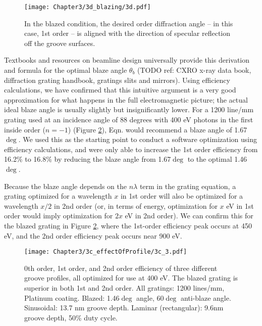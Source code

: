 \begin{figure}[htbp] %
   \centering
   \texttt{[image: Chapter3/3d\_blazing/3d.pdf]} 
   \caption{In the blazed condition, the desired order diffraction angle -- in this case, 1st order -- is aligned with the direction of specular reflection off the groove surfaces.}
   \label{3d}
\end{figure}

Textbooks and resources on beamline design universally provide this derivation and formula for the optimal blaze angle $\theta_b$ (TODO ref: CXRO x-ray data book, diffraction grating handbook, gratings slits and mirrors).  Using efficiency calculations, we have confirmed that this intuitive argument is a very good approximation for what happens in the full electromagnetic picture; the actual ideal blaze angle is usually slightly but insignificantly lower.  For a 1200 line/mm grating used at an incidence angle of 88 degrees with 400 eV photons in the first inside order ($n=-1$) (Figure \ref{3c-plot}), Eqn.  would recommend a blaze angle of 1.67$\deg$.  We used this as the starting point to conduct a software optimization using efficiency calculations, and were only able to increase the 1st order efficiency from 16.2\% to 16.8\% by reducing the blaze angle from 1.67$\deg$ to the optimal 1.46$\deg$.

Because the blaze angle depends on the $n \lambda$ term in the grating equation, a grating optimized for a wavelength $x$ in 1st order will also be optimized for a wavelength $x/2$ in 2nd order (or, in terms of energy, optimization for $x$ eV in 1st order would imply optimization for $2x$ eV in 2nd order).  We can confirm this for the blazed grating in Figure \ref{3c-plot}, where the 1st-order efficiency peak occurs at 450 eV, and the 2nd order efficiency peak occurs near 900 eV.

\begin{figure}[htbp] %
   \centering
   \texttt{[image: Chapter3/3c\_effectOfProfile/3c\_3.pdf]} 
   \caption[0th order, 1st order, and 2nd order efficiency of three different groove profiles, all optimized for use at 400 eV.]{0th order, 1st order, and 2nd order efficiency of three different groove profiles, all optimized for use at 400 eV.  The blazed grating is superior in both 1st and 2nd order.  All gratings: 1200 lines/mm, Platinum coating.  Blazed: 1.46$\deg$ angle, 60$\deg$ anti-blaze angle.  Sinusoidal: 13.7 nm groove depth.  Laminar (rectangular): 9.6nm groove depth, 50\% duty cycle. }
   \label{3c-plot}
\end{figure}


